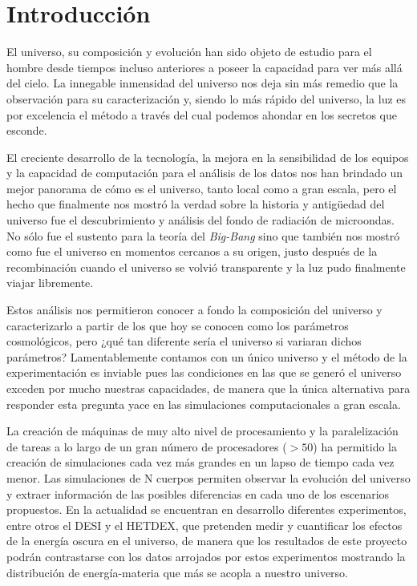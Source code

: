 \chapter{Introducción}

El universo, su composición y evolución han sido objeto de estudio para el hombre desde tiempos incluso anteriores a poseer la capacidad para ver más allá del cielo. La innegable inmensidad del universo nos deja sin más remedio que la observación para su caracterización y, siendo lo más rápido del universo, la luz es por excelencia el método a través del cual podemos ahondar en los secretos que esconde.

El creciente desarrollo de la tecnología, la mejora en la sensibilidad de los equipos y la capacidad de computación para el análisis de los datos nos han brindado un mejor panorama de cómo es el universo, tanto local como a gran escala, pero el hecho que finalmente nos mostró la verdad sobre la historia y antigüedad del universo fue el descubrimiento y análisis del fondo de radiación de microondas. No sólo fue el sustento para la teoría del \textit{Big-Bang} sino que también nos mostró como fue el universo en momentos cercanos a su origen, justo después de la recombinación cuando el universo se volvió transparente y la luz pudo finalmente viajar libremente. 

Estos análisis nos permitieron conocer a fondo la composición del universo y caracterizarlo a partir de los que hoy se conocen como los parámetros cosmológicos, pero ¿qué tan diferente sería el universo si variaran dichos parámetros? Lamentablemente contamos con un único universo y el método de la experimentación es inviable pues las condiciones en las que se generó el universo exceden por mucho nuestras capacidades, de manera que la única alternativa para responder esta pregunta yace en las simulaciones computacionales a gran escala. 

La creación de máquinas de muy alto nivel de procesamiento y la paralelización de tareas a lo largo de un gran número de procesadores ($>50$) ha permitido la creación de simulaciones cada vez más grandes en un lapso de tiempo cada vez menor. Las simulaciones de N cuerpos permiten observar la evolución del universo y extraer información de las posibles diferencias en cada uno de los escenarios propuestos. En la actualidad se encuentran en desarrollo diferentes experimentos, entre otros el DESI\cite{desi} y el HETDEX\cite{hetdex}, que pretenden medir y cuantificar los efectos de la energía oscura en el universo, de manera que los resultados de este proyecto podrán contrastarse con los datos arrojados por estos experimentos mostrando la distribución de energía-materia que más se acopla a nuestro universo.

